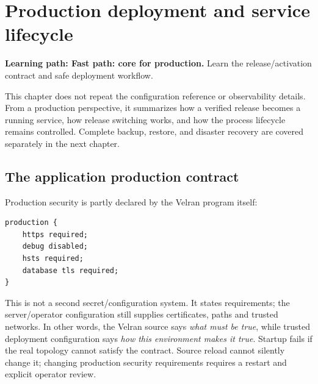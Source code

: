 \chapter{Production deployment and service lifecycle}

\noindent\textbf{Learning path: Fast path: core for production.} Learn the release/activation contract and safe deployment workflow.\par\medskip



This chapter does not repeat the configuration reference or observability details. From a production perspective, it summarizes how a verified release becomes a running service, how release switching works, and how the process lifecycle remains controlled. Complete backup, restore, and disaster recovery are covered separately in the next chapter.

\section{The application production contract}

Production security is partly declared by the Velran program itself:

\begin{lstlisting}[language=Velran]
production {
    https required;
    debug disabled;
    hsts required;
    database tls required;
}
\end{lstlisting}

This is not a second secret/configuration system. It states requirements; the server/operator configuration still supplies certificates, paths and trusted networks. In other words, the Velran source says \emph{what must be true}, while trusted deployment configuration says \emph{how this environment makes it true}. Startup fails if the real topology cannot satisfy the contract. Source reload cannot silently change it; changing production security requirements requires a restart and explicit operator review.

